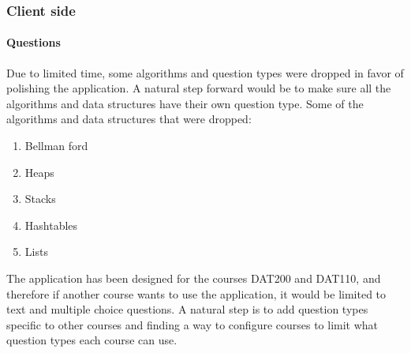 \subsubsection{Client side}
\paragraph{Questions}
Due to limited time, some algorithms and question types were dropped in favor of polishing the application. A natural step forward would be to make sure all the algorithms and data structures have their own question type. Some of the algorithms and data structures that were dropped: 
\begin{enumerate}
	\item Bellman ford
	\item Heaps
	\item Stacks
	\item Hashtables
	\item Lists
\end{enumerate}
The application has been designed for the courses DAT200 and DAT110, and therefore if another course wants to use the application, it would be limited to text and multiple choice questions. A natural step is to add question types specific to other courses and finding a way to configure courses to limit what question types each course can use.